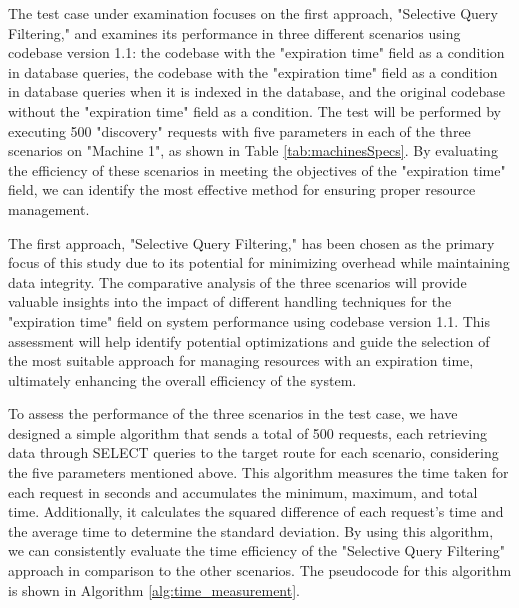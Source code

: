 \documentclass[a4paper,fleqn]{cas-dc}
\begin{document}
The test case under examination focuses on the first approach, "Selective Query Filtering," and examines its performance in three different scenarios using codebase version 1.1: the codebase with the "expiration time" field as a condition in database queries, the codebase with the "expiration time" field as a condition in database queries when it is indexed in the database, and the original codebase without the "expiration time" field as a condition. The test will be performed by executing 500 "discovery" requests with five parameters in each of the three scenarios on "Machine 1", as shown in Table \ref{tab:machinesSpecs}. By evaluating the efficiency of these scenarios in meeting the objectives of the "expiration time" field, we can identify the most effective method for ensuring proper resource management.

The first approach, "Selective Query Filtering," has been chosen as the primary focus of this study due to its potential for minimizing overhead while maintaining data integrity. The comparative analysis of the three scenarios will provide valuable insights into the impact of different handling techniques for the "expiration time" field on system performance using codebase version 1.1. This assessment will help identify potential optimizations and guide the selection of the most suitable approach for managing resources with an expiration time, ultimately enhancing the overall efficiency of the system.

To assess the performance of the three scenarios in the test case, we have designed a simple algorithm that sends a total of 500 requests, each retrieving data through SELECT queries to the target route for each scenario, considering the five parameters mentioned above. This algorithm measures the time taken for each request in seconds and accumulates the minimum, maximum, and total time. Additionally, it calculates the squared difference of each request's time and the average time to determine the standard deviation. By using this algorithm, we can consistently evaluate the time efficiency of the "Selective Query Filtering" approach in comparison to the other scenarios. The pseudocode for this algorithm is shown in Algorithm \ref{alg:time_measurement}.
\end{document}
